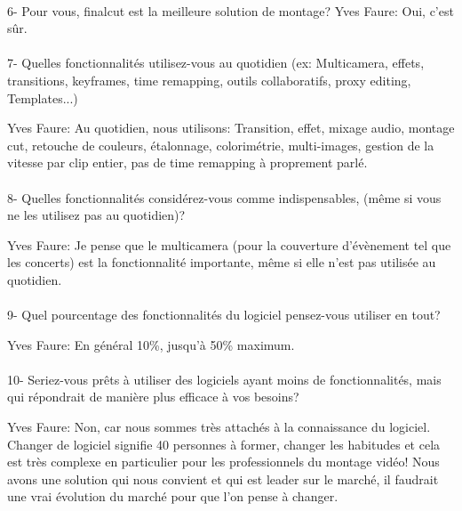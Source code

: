 \paragraph{}
6- Pour vous, finalcut est la meilleure solution de montage?
Yves Faure: Oui, c'est sûr.

\paragraph{}
7-  Quelles fonctionnalités utilisez-vous au quotidien (ex: Multicamera, effets,
transitions, keyframes, time remapping, outils collaboratifs, proxy
editing, Templates...)

Yves Faure: Au quotidien, nous utilisons: Transition, effet, mixage audio, montage cut,
retouche de couleurs, étalonnage, colorimétrie, multi-images, gestion de la
vitesse par clip entier, pas de time remapping à proprement parlé.

\paragraph{}
8-  Quelles fonctionnalités considérez-vous comme indispensables, (même si vous
ne les utilisez pas au quotidien)?

Yves Faure: Je pense que le multicamera (pour la couverture d'évènement tel que les
concerts) est la fonctionnalité importante, même si elle n'est pas utilisée au quotidien.

\paragraph{}
9- Quel pourcentage des fonctionnalités du logiciel pensez-vous utiliser
en tout?

Yves Faure: En général 10\%, jusqu'à 50\% maximum.

\paragraph{}
10- Seriez-vous prêts à utiliser des logiciels ayant moins de
fonctionnalités, mais qui répondrait de manière plus efficace
à vos besoins?

Yves Faure: Non, car nous sommes très attachés à la connaissance du logiciel.
Changer de logiciel signifie 40 personnes à former, changer les
habitudes et cela est très complexe en particulier pour les professionnels
du montage vidéo! Nous avons une solution qui nous convient et qui est leader
sur le marché, il faudrait une vrai évolution du marché pour que l'on pense à
changer.

